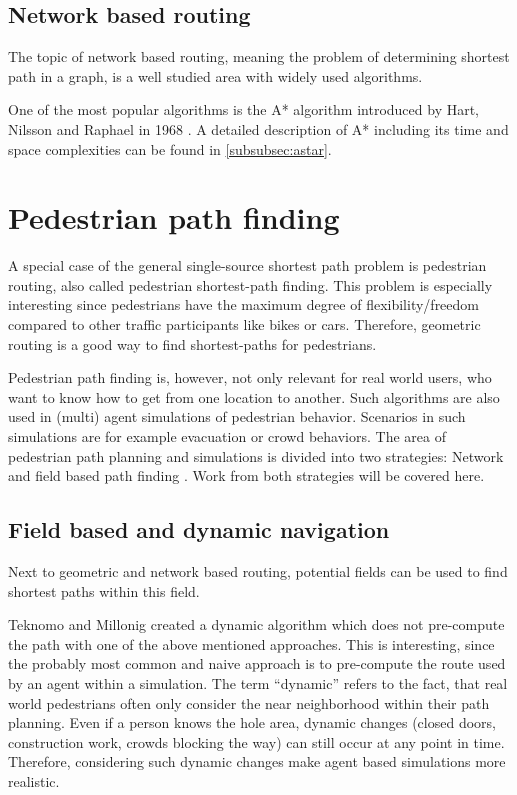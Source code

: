 	\subsection{Network based routing}
	
		The topic of network based routing, meaning the problem of determining shortest path in a graph, is a well studied area with widely used algorithms.
		
		One of the most popular algorithms is the A* algorithm introduced by Hart, Nilsson and Raphael in 1968 \cite{astar}.
		A detailed description of A* including its time and space complexities can be found in \cref{subsubsec:astar}.
		

\section{Pedestrian path finding}
\label{sec:pedestrian-path-planning}
	
	A special case of the general single-source shortest path problem is pedestrian routing, also called pedestrian shortest-path finding.
	This problem is especially interesting since pedestrians have the maximum degree of flexibility/freedom compared to other traffic participants like bikes or cars.
	Therefore, geometric routing is a good way to find shortest-paths for pedestrians.
	
	Pedestrian path finding is, however, not only relevant for real world users, who want to know how to get from one location to another.
	Such algorithms are also used in (multi) agent simulations of pedestrian behavior.
	Scenarios in such simulations are for example evacuation or crowd behaviors.
	The area of pedestrian path planning and simulations is divided into two strategies: Network and field based path finding \cite{hartmann-geodesic}.
	Work from both strategies will be covered here.
	
	\subsection{Field based and dynamic navigation}
	
		Next to geometric and network based routing, potential fields can be used to find shortest paths within this field.
		
		Teknomo and Millonig created a dynamic algorithm which does not pre-compute the path with one of the above mentioned approaches\cite{teknomo-millonig-routing}.
		This is interesting, since the probably most common and naive approach is to pre-compute the route used by an agent within a simulation.
		The term \enquote{dynamic} refers to the fact, that real world pedestrians often only consider the near neighborhood within their path planning.
		Even if a person knows the hole area, dynamic changes (closed doors, construction work, crowds blocking the way) can still occur at any point in time.
		Therefore, considering such dynamic changes make agent based simulations more realistic.
		
